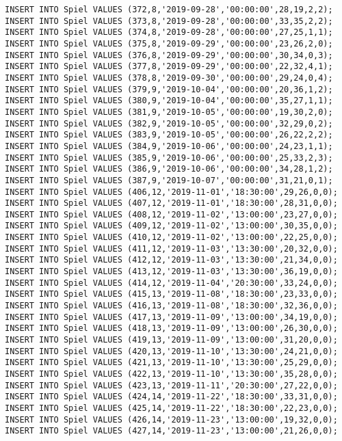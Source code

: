 \documentclass{bschlangaul-aufgabe}
\begin{document}
\begin{verbatim}
INSERT INTO Spiel VALUES (372,8,'2019-09-28','00:00:00',28,19,2,2);
INSERT INTO Spiel VALUES (373,8,'2019-09-28','00:00:00',33,35,2,2);
INSERT INTO Spiel VALUES (374,8,'2019-09-28','00:00:00',27,25,1,1);
INSERT INTO Spiel VALUES (375,8,'2019-09-29','00:00:00',23,26,2,0);
INSERT INTO Spiel VALUES (376,8,'2019-09-29','00:00:00',30,34,0,3);
INSERT INTO Spiel VALUES (377,8,'2019-09-29','00:00:00',22,32,4,1);
INSERT INTO Spiel VALUES (378,8,'2019-09-30','00:00:00',29,24,0,4);
INSERT INTO Spiel VALUES (379,9,'2019-10-04','00:00:00',20,36,1,2);
INSERT INTO Spiel VALUES (380,9,'2019-10-04','00:00:00',35,27,1,1);
INSERT INTO Spiel VALUES (381,9,'2019-10-05','00:00:00',19,30,2,0);
INSERT INTO Spiel VALUES (382,9,'2019-10-05','00:00:00',32,29,0,2);
INSERT INTO Spiel VALUES (383,9,'2019-10-05','00:00:00',26,22,2,2);
INSERT INTO Spiel VALUES (384,9,'2019-10-06','00:00:00',24,23,1,1);
INSERT INTO Spiel VALUES (385,9,'2019-10-06','00:00:00',25,33,2,3);
INSERT INTO Spiel VALUES (386,9,'2019-10-06','00:00:00',34,28,1,2);
INSERT INTO Spiel VALUES (387,9,'2019-10-07','00:00:00',31,21,0,1);
INSERT INTO Spiel VALUES (406,12,'2019-11-01','18:30:00',29,26,0,0);
INSERT INTO Spiel VALUES (407,12,'2019-11-01','18:30:00',28,31,0,0);
INSERT INTO Spiel VALUES (408,12,'2019-11-02','13:00:00',23,27,0,0);
INSERT INTO Spiel VALUES (409,12,'2019-11-02','13:00:00',30,35,0,0);
INSERT INTO Spiel VALUES (410,12,'2019-11-02','13:00:00',22,25,0,0);
INSERT INTO Spiel VALUES (411,12,'2019-11-03','13:30:00',20,32,0,0);
INSERT INTO Spiel VALUES (412,12,'2019-11-03','13:30:00',21,34,0,0);
INSERT INTO Spiel VALUES (413,12,'2019-11-03','13:30:00',36,19,0,0);
INSERT INTO Spiel VALUES (414,12,'2019-11-04','20:30:00',33,24,0,0);
INSERT INTO Spiel VALUES (415,13,'2019-11-08','18:30:00',23,33,0,0);
INSERT INTO Spiel VALUES (416,13,'2019-11-08','18:30:00',32,36,0,0);
INSERT INTO Spiel VALUES (417,13,'2019-11-09','13:00:00',34,19,0,0);
INSERT INTO Spiel VALUES (418,13,'2019-11-09','13:00:00',26,30,0,0);
INSERT INTO Spiel VALUES (419,13,'2019-11-09','13:00:00',31,20,0,0);
INSERT INTO Spiel VALUES (420,13,'2019-11-10','13:30:00',24,21,0,0);
INSERT INTO Spiel VALUES (421,13,'2019-11-10','13:30:00',25,29,0,0);
INSERT INTO Spiel VALUES (422,13,'2019-11-10','13:30:00',35,28,0,0);
INSERT INTO Spiel VALUES (423,13,'2019-11-11','20:30:00',27,22,0,0);
INSERT INTO Spiel VALUES (424,14,'2019-11-22','18:30:00',33,31,0,0);
INSERT INTO Spiel VALUES (425,14,'2019-11-22','18:30:00',22,23,0,0);
INSERT INTO Spiel VALUES (426,14,'2019-11-23','13:00:00',19,32,0,0);
INSERT INTO Spiel VALUES (427,14,'2019-11-23','13:00:00',21,26,0,0);

\end{verbatim}
\end{document}
